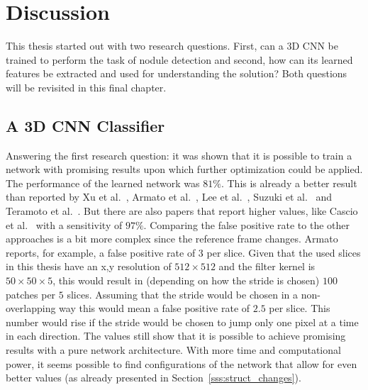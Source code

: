 \documentclass[main.tex]{subfiles}
\begin{document}
\chapter{Discussion}\label{chap:discussion}
This thesis started out with two research questions. First, can a 3D CNN be trained to perform the task of nodule detection and second, how can its learned features be extracted and used for understanding the solution? Both questions will be revisited in this final chapter.

\section{A 3D CNN Classifier}
Answering the first research question: it was shown that it is possible to train a network with promising results upon which further optimization could be applied. The performance of the learned network was $81\%$. This is already a better result than reported by Xu et al.~\cite{xu1997development}, Armato et al.~\cite{armato1999computerized}, Lee et al.~\cite{lee2001automated}, Suzuki et al.~\cite{suzuki2003massive} and Teramoto et al.~\cite{teramoto2013fast}. But there are also papers that report higher values, like Cascio et al.~\cite{cascio2012automatic} with a sensitivity of $97\%$. Comparing the false positive rate to the other approaches is a bit more complex since the reference frame changes. Armato~\cite{armato1999computerized} reports, for example, a false positive rate of 3 per slice. Given that the used slices in this thesis have an x,y resolution of $512 \times 512$ and the filter kernel is $50 \times 50 \times 5$, this would result in (depending on how the stride is chosen) $100$ patches per $5$ slices. Assuming that the stride would be chosen in a non-overlapping way this would mean a false positive rate of $2.5$ per slice. This number would rise if the stride would be chosen to jump only one pixel at a time in each direction. The values still show that it is possible to achieve promising results with a pure network architecture. With more time and computational power, it seems possible to find configurations of the network that allow for even better values (as already presented in Section~\ref{sss:struct_changes}). 
\end{document}
